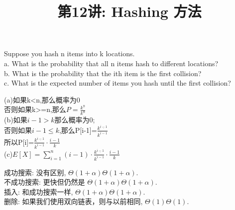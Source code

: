 \documentclass[a4paper, justified]{tufte-handout}
\title{第12讲: Hashing 方法}
\date{\zhtoday} %
\begin{document}
\maketitle
\noplagiarism %
\begin{abstract}
\end{abstract}
\beginrequired

\begin{problem}[CS 5.5-8 ($a, b, c$)]
Suppose you hash n items into k locations.\\
a. What is the probability that all n items hash to different
locations?\\
b. What is the probability that the ith item is the first collision?\\
c. What is the expected number of items you hash until the first
collision?
\end{problem}

\begin{solution}
  (a)如果k<n,那么概率为0\\
  否则如果k>=n,那么$P=\frac{k^{\underline{n}}}{k^n}$\\
  (b)如果$i-1>k$那么概率为0;\\
  否则如果$i-1\leq k$,那么P[i-1]=$\frac{k^{\underline{i-1}}}{k^{i-1}}$\\
  所以P[i]=$\frac{k^{\underline{i-1}}}{k^{i-1}} \cdot \frac{i-1}{k}$\\
  (c)$E[X]=\sum _{i=1}^n(i-1)\cdot \frac{k^{\underline{i-1}}}{k^{i-1}}\cdot \frac{i-1}{k}$
\end{solution}


\begin{problem}[TC 11.2-3]
\end{problem}

\begin{solution}
  成功搜索: 没有区别, $\Theta(1 + \alpha)Θ(1+α)$.\\
  不成功搜索: 更快但仍然是 $\Theta(1 + \alpha)Θ(1+α)$.\\
  插入: 和成功搜索一样, $\Theta(1 + \alpha)Θ(1+α)$.\\
  删除: 如果我们使用双向链表，则与以前相同, $\Theta(1)Θ(1)$.
\end{solution}
\end{document}
